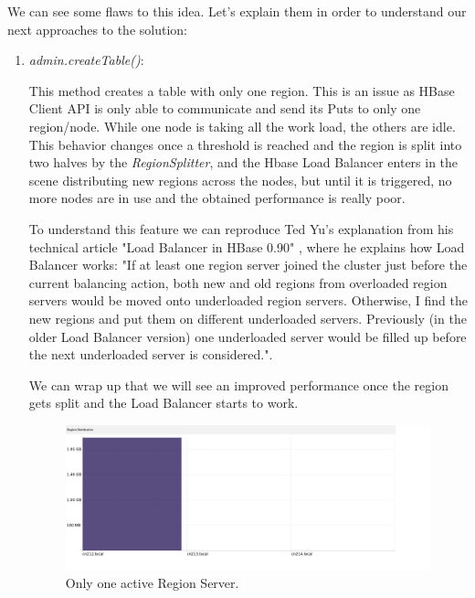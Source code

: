 \bigskip


\par

We can see some flaws to this idea. Let's explain them in order to understand our next approaches to the solution:

\begin{enumerate}
\item \textit{admin.createTable()}:
\par
This method creates a table with only one region. This is an issue as HBase Client API is only able to communicate and send its Puts to only one region/node. While one node is taking all the work load, the others are idle. This behavior changes once a threshold is reached and the region is split into two halves by the \textit{RegionSplitter}, and the Hbase Load Balancer enters in the scene distributing new regions across the nodes, but until it is triggered, no more nodes are in use and the obtained performance is really poor.
\par

To understand this feature we can reproduce Ted Yu's explanation from his technical article "Load Balancer in HBase 0.90" \cite{LoadBalancer}, where he explains how Load Balancer works: "If at least one region server joined the cluster just before the current balancing action, both new and old regions from overloaded region servers would be moved onto underloaded region servers. Otherwise, I find the new regions and put them on different underloaded servers. Previously (in the older Load Balancer version) one underloaded server would be filled up before the next underloaded server is considered.".
\par
We can wrap up that we will see an improved performance once the region gets split and the Load Balancer starts to work.



\bigskip
\begin{figure}[htb]
\centering
\includegraphics[width=1.2\textwidth,height=0.41\textheight]{./images/1regionserveractive1.png}
\caption{Only one active Region Server.} \label{fig:1regionserveractive}
\end{figure}



\end{enumerate}
